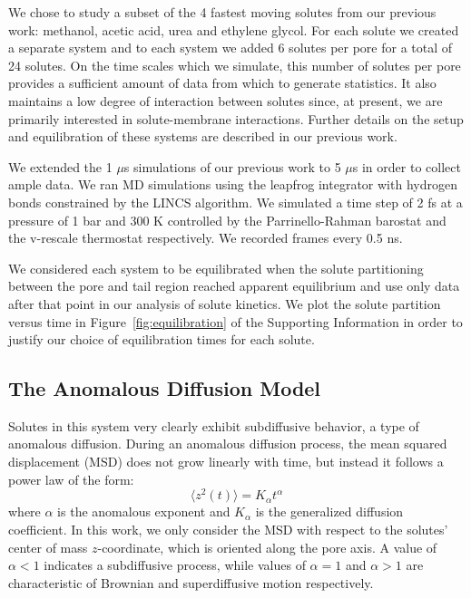 \documentclass[journal=ancac3,manuscript=article,layout=twocolumn]{achemso}
\begin{document}
  We chose to study a subset of the 4 fastest moving solutes from our previous
  work: methanol, acetic acid, urea and ethylene glycol. For each solute we 
  created a separate system and to each system we added 6 solutes per pore 
  for a total of 24 solutes. On the time scales which we simulate, this number
  of solutes per pore provides a sufficient amount of data from which to 
  generate statistics. It also maintains a low degree of interaction between
  solutes since, at present, we are primarily interested in solute-membrane 
  interactions. Further details on the setup and equilibration of these systems
  are described in our previous work.\cite{coscia_chemically_2019}
  
  We extended the 1 $\mu$s simulations of our previous work to 5 $\mu$s in order
  to collect ample data. We ran MD simulations using the leapfrog integrator with 
  hydrogen bonds constrained by the LINCS algorithm. We simulated a time step of 2 fs at
  a pressure of 1 bar and 300 K controlled by the Parrinello-Rahman barostat and
  the v-rescale thermostat respectively. We recorded frames every 0.5 ns.
  
  We considered each system to be equilibrated when the solute partitioning between the 
  pore and tail region reached apparent equilibrium and use only data after that point
  in our analysis of solute kinetics. We plot the solute partition versus time in
  Figure~\ref{fig:equilibration} of the Supporting Information in order to justify
  our choice of equilibration times for each solute.

  \subsection{The Anomalous Diffusion Model}\label{method:model_sFBM}

  Solutes in this system very clearly exhibit subdiffusive behavior, a type of
  anomalous diffusion. During an anomalous diffusion process, the mean squared 
  displacement (MSD) does not grow linearly with time, but instead it follows 
  a power law of the form: 
  \begin{equation} 
  \langle z^2(t) \rangle = K_{\alpha}t^{\alpha}
  \label{eqn:msd_form}
  \end{equation} 
  where $\alpha$ is the anomalous exponent and $K_{\alpha}$ is the generalized 
  diffusion coefficient. In this work, we only consider the MSD with respect to
  the solutes' center of mass $z$-coordinate, which is oriented along the pore 
  axis. A value of $\alpha < 1$ indicates a subdiffusive process, while values
  of $\alpha = 1$ and $\alpha > 1$ are characteristic of Brownian and 
  superdiffusive motion respectively.
 
\end{document}
